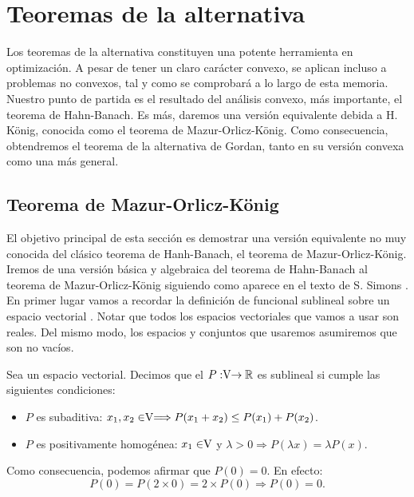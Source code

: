 \chapter{Teoremas de la alternativa}
Los teoremas de la alternativa constituyen una potente herramienta en optimización. A pesar de tener un claro carácter convexo, se aplican incluso a problemas no convexos, tal y como se comprobará a lo largo de esta memoria. Nuestro punto de partida es el resultado del análisis  convexo, más importante, el teorema de Hahn-Banach. Es más, daremos una versión equivalente debida a H. König, conocida como el teorema de Mazur-Orlicz-König. Como consecuencia, obtendremos el teorema de la alternativa de Gordan, tanto en su versión convexa como una más general. 

\section{Teorema de Mazur-Orlicz-König}
El objetivo principal de esta sección es demostrar una versión equivalente no muy conocida del clásico teorema de Hanh-Banach, el teorema de Mazur-Orlicz-König. Iremos de una versión básica y algebraica del teorema de Hahn-Banach al teorema de Mazur-Orlicz-König siguiendo como aparece en el texto de S. Simons \cite{Simons2008}. \\
	
En primer lugar vamos a recordar la definición de funcional sublineal sobre un espacio vectorial \vecSpace . Notar que todos los espacios vectoriales que vamos a usar son reales. Del mismo modo, los espacios y conjuntos que usaremos asumiremos que son no vacíos.
	
\begin{definicion}
Sea \vecSpace un espacio vectorial. Decimos que el $P:\vecSpace \rightarrow \RR$ es sublineal si cumple las siguientes condiciones:
	\begin{itemize}
		\item $ P $ es subaditiva: $x_1, x_2 \in \vecSpace \Longrightarrow P(x_1 + x_2) \leq P(x_1) + P(x_2) $.
		\item $ P $ es positivamente homogénea: $x_1 \in \vecSpace $ y $ \lambda > 0 \Longrightarrow P(\lambda x) = \lambda P(x) $.
	\end{itemize}
\end{definicion}

Como consecuencia, podemos afirmar que $ P(0) = 0 $. En efecto:
\[
P(0) = P(2\times0) = 2\times P(0) \Longrightarrow P(0) = 0.
\]

